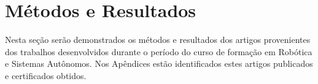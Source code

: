 \chapter{Métodos e Resultados}
\label{chap:result}
Nesta seção serão demonstrados os métodos e resultados dos artigos provenientes dos trabalhos desenvolvidos durante o período do curso de formação em Robótica e Sistemas Autônomos.
Nos Apêndices estão identificados estes artigos publicados e certificados obtidos. 






